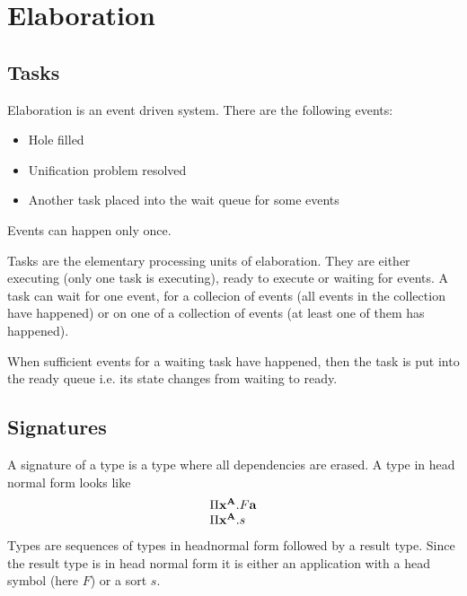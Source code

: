\section{Elaboration}





\subsection{Tasks}

Elaboration is an event driven system. There are the following events:

\begin{itemize}
    \item Hole filled
    \item Unification problem resolved
    \item Another task placed into the wait queue for some events
\end{itemize}

Events can happen only once.

Tasks are the elementary processing units of elaboration. They are either
executing (only one task is executing), ready to execute or waiting for events.
A task can wait for one event, for a collecion of events (all events in the
collection have happened) or on one of a collection of events (at least one of
them has happened).

When sufficient events for a waiting task have happened, then the task is put
into the ready queue i.e. its state changes from waiting to ready.





\subsection{Signatures}

A signature of a type is a type where all dependencies are erased. A type in
head normal form looks like
$$
\begin{array}{l}
    \Pi {{\mathbf x}^{{\mathbf A}}}. F {\mathbf a}
    \\
    \Pi {{\mathbf x}^{{\mathbf A}}}. s
\end{array}
$$
Types are sequences of types in headnormal form followed by a result type. Since
the result type is in head normal form it is either an application with a head
symbol (here $F$) or a sort $s$.


